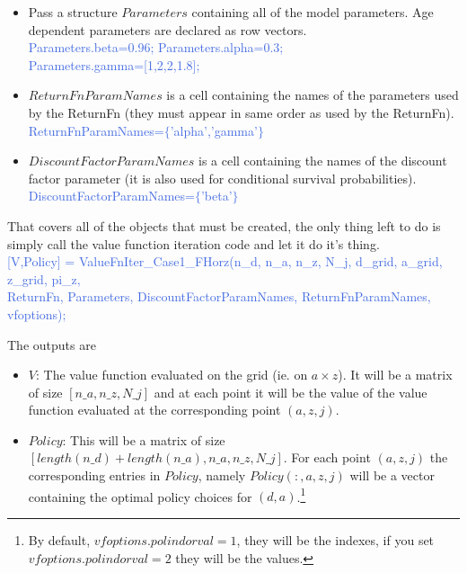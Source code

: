 \begin{itemize}
     cut the run time for the value function iteration. \\
     \textcolor{RoyalBlue}{V0=ones(n\_{}a,n\_{}z);}
 \item Pass a structure $Parameters$ containing all of the model parameters. Age dependent parameters are declared as row vectors. \\
     \textcolor{RoyalBlue}{Parameters.beta=0.96; Parameters.alpha=0.3;} \\
     \textcolor{RoyalBlue}{Parameters.gamma=[1,2,2,1.8];}
 \item $ReturnFnParamNames$ is a cell containing the names of the parameters used by the ReturnFn (they must appear in same order as used by the ReturnFn). \\
     \textcolor{RoyalBlue}{ReturnFnParamNames=$\{$'alpha','gamma'$\}$}
 \item $DiscountFactorParamNames$ is a cell containing the names of the discount factor parameter (it is also used for conditional survival probabilities). \\
     \textcolor{RoyalBlue}{DiscountFactorParamNames=$\{$'beta'$\}$}
\end{itemize}

That covers all of the objects that must be created, the only thing left to do is simply call the value function iteration code and let it do it's thing. \\
\textcolor{RoyalBlue}{[V,Policy] = ValueFnIter\_{}Case1\_{}FHorz(n\_{}d, n\_{}a, n\_{}z, N\_{}j, d\_{}grid, a\_{}grid, z\_{}grid, pi\_{}z, } \\
\indent \indent \textcolor{RoyalBlue}{ReturnFn, Parameters, DiscountFactorParamNames, ReturnFnParamNames, vfoptions);}

The outputs are
\begin{itemize}
 \item $V$: The value function evaluated on the grid (ie. on $a \times z$). It will be a matrix of size $[n\_{}a,n\_{}z, N\_{}j]$ and at each point it will be the value of the value function evaluated
    at the corresponding point $(a,z,j)$.
 \item $Policy$: This will be a matrix of size $[length(n\_{}d)+length(n\_{}a), n\_{}a, n\_{}z, N\_{}j]$. For each point $(a,z,j)$ the corresponding entries in $Policy$, namely $Policy(:,a,z,j)$ will be a vector containing
    the optimal policy choices for $(d,a)$.\footnote{By default, $vfoptions.polindorval=1$, they will be the indexes, if you set $vfoptions.polindorval=2$ they will be the values.}
\end{itemize}

